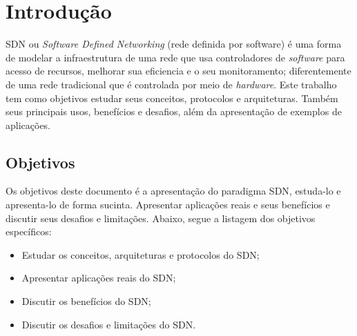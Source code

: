 \chapter{Introdução}
\label{cap:intro}

SDN ou \textit{Software Defined Networking} (rede definida por software) é uma forma de modelar a infraestrutura de uma rede que usa
controladores de \textit{software} para acesso de recursos, melhorar sua eficiencia e o seu monitoramento; diferentemente de uma rede
tradicional que é controlada por meio de \textit{hardware}. Este trabalho tem como objetivos estudar seus conceitos, protocolos e
arquiteturas. Também seus principais usos, benefícios e desafios, além da apresentação de exemplos de aplicações.

\section{Objetivos}
\label{sec:objetivos}

Os objetivos deste documento é a apresentação do paradigma SDN, estuda-lo e apresenta-lo de forma sucinta. Apresentar
aplicações reais e seus benefícios e discutir seus desafios e limitações. Abaixo, segue a listagem dos objetivos específicos:

\begin{itemize}
    \item Estudar os conceitos, arquiteturas e protocolos do SDN;
    \item Apresentar aplicações reais do SDN;
    \item Discutir os benefícios do SDN;
    \item Discutir os desafios e limitações do SDN.
\end{itemize}

